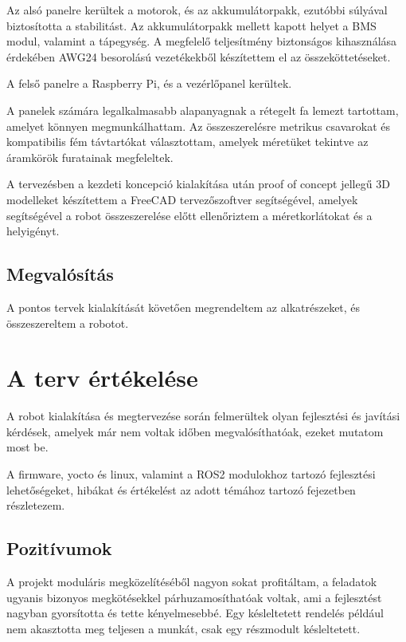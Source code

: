 Az alsó panelre kerültek a motorok, és az akkumulátorpakk, ezutóbbi súlyával
biztosította a stabilitást. Az akkumulátorpakk mellett kapott helyet a BMS modul,
valamint a tápegység. A megfelelő teljesítmény biztonságos kihasználása érdekében
AWG24 besorolású vezetékekből készítettem el az összeköttetéseket.

A felső panelre a Raspberry Pi, és a vezérlőpanel kerültek.

A panelek számára legalkalmasabb alapanyagnak a rétegelt fa lemezt tartottam,
amelyet könnyen megmunkálhattam. Az összeszerelésre metrikus csavarokat és
kompatibilis fém távtartókat választottam, amelyek méretüket tekintve az
áramkörök furatainak megfeleltek.

A tervezésben a kezdeti koncepció kialakítása után proof of concept jellegű 
3D modelleket készítettem a FreeCAD tervezőszoftver segítségével, amelyek
segítségével a robot összeszerelése előtt ellenőriztem a méretkorlátokat és a
helyigényt.


\subsection{Megvalósítás}

A pontos tervek kialakítását követően megrendeltem az alkatrészeket, és
összeszereltem a robotot.

\section{A terv értékelése}

A robot kialakítása és megtervezése során felmerültek olyan fejlesztési és
javítási kérdések, amelyek már nem voltak időben megvalósíthatóak, ezeket mutatom
most be.

A firmware, yocto és linux, valamint a ROS2 modulokhoz tartozó fejlesztési
lehetőségeket, hibákat és értékelést az adott témához tartozó fejezetben
részletezem.

\subsection{Pozitívumok}

A projekt moduláris megközelítéséből nagyon sokat profitáltam, a feladatok
ugyanis bizonyos megkötésekkel párhuzamosíthatóak voltak, ami a fejlesztést
nagyban gyorsította és tette kényelmesebbé. Egy késleltetett rendelés például nem
akasztotta meg teljesen a munkát, csak egy részmodult késleltetett.

